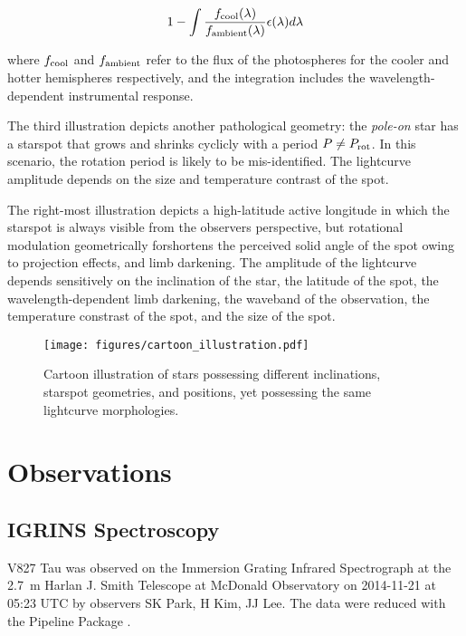 \documentclass[twocolumn]{emulateapj}%
\begin{document}
\begin{equation}
1- \int \frac{f_{\rm cool}(\lambda)}{f_{\rm ambient}(\lambda)} \epsilon(\lambda) d\lambda
\end{equation}

where $f_{\rm cool}$ and $f_{\rm ambient}$ refer to the flux of the photospheres for the cooler and hotter hemispheres respectively, and the integration includes the wavelength-dependent instrumental response.

The third illustration depicts another pathological geometry: the \emph{pole-on} star has a starspot that grows and shrinks cyclicly with a period $P \neq P_{\rm rot}$.  In this scenario, the rotation period is likely to be mis-identified.  The lightcurve amplitude depends on the size and temperature contrast of the spot.

The right-most illustration depicts a high-latitude active longitude in which the starspot is always visible from the observers perspective, but rotational modulation geometrically forshortens the perceived solid angle of the spot owing to projection effects, and limb darkening.  The amplitude of the lightcurve depends sensitively on the inclination of the star, the latitude of the spot, the wavelength-dependent limb darkening, the waveband of the observation, the temperature constrast of the spot, and the size of the spot.


\begin{figure*}
 \centering
 \texttt{[image: figures/cartoon\_illustration.pdf]}
 \caption{Cartoon illustration of stars possessing different inclinations, starspot geometries, and positions, yet possessing the same lightcurve morphologies.}
 \label{fig:cartoon}
\end{figure*}




\section{Observations}\label{sec:obs}

\subsection{IGRINS Spectroscopy}\label{sec:igrins}

V827 Tau was observed on the Immersion Grating Infrared Spectrograph \citep[IGRINS]{park14} at the 2.7~m Harlan J. Smith Telescope at McDonald Observatory on 2014-11-21 at 05:23 UTC by observers SK Park, H Kim, JJ Lee.  The data were reduced with the Pipeline Package \citep{jaejoonlee15}.
\end{document}
